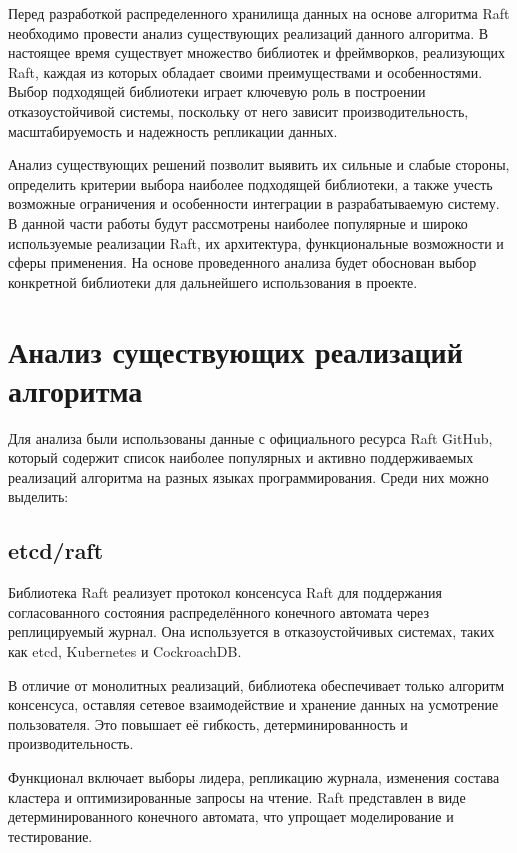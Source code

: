 
Перед разработкой распределенного хранилища данных на основе алгоритма Raft необходимо
провести анализ существующих реализаций данного алгоритма. В настоящее время существует
множество библиотек и фреймворков, реализующих Raft, каждая из которых обладает своими
преимуществами и особенностями. Выбор подходящей библиотеки играет ключевую роль в
построении отказоустойчивой системы, поскольку от него зависит производительность,
масштабируемость и надежность репликации данных.

Анализ существующих решений позволит выявить их сильные и слабые стороны, определить
критерии выбора наиболее подходящей библиотеки, а также учесть возможные ограничения и
особенности интеграции в разрабатываемую систему. В данной части работы будут
рассмотрены наиболее популярные и широко используемые реализации Raft, их архитектура,
функциональные возможности и сферы применения. На основе проведенного анализа будет
обоснован выбор конкретной библиотеки для дальнейшего использования в проекте.

\section{Анализ существующих реализаций алгоритма}

Для анализа были использованы данные с официального ресурса Raft GitHub, который
содержит список наиболее популярных и активно поддерживаемых реализаций алгоритма на
разных языках программирования. Среди них можно выделить:

\subsection{etcd/raft}

Библиотека Raft реализует протокол консенсуса Raft для поддержания согласованного
состояния распределённого конечного автомата через реплицируемый журнал. Она
используется в отказоустойчивых системах, таких как etcd, Kubernetes и CockroachDB.

В отличие от монолитных реализаций, библиотека обеспечивает только алгоритм консенсуса,
оставляя сетевое взаимодействие и хранение данных на усмотрение пользователя. Это
повышает её гибкость, детерминированность и производительность.

Функционал включает выборы лидера, репликацию журнала, изменения состава кластера и
оптимизированные запросы на чтение. Raft представлен в виде детерминированного
конечного автомата, что упрощает моделирование и тестирование.

